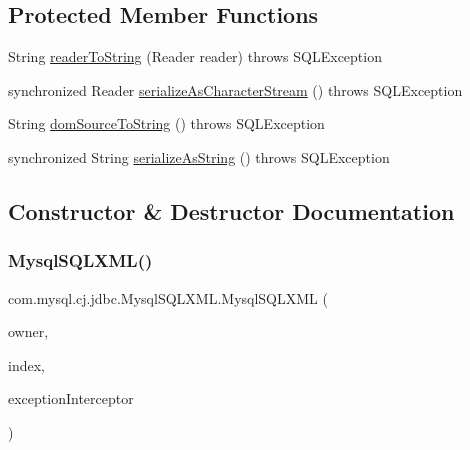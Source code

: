 \subsection*{Protected Member Functions}
\begin{DoxyCompactItemize}
\item 
String \mbox{\hyperlink{classcom_1_1mysql_1_1cj_1_1jdbc_1_1_mysql_s_q_l_x_m_l_ad11ae3ca836ed96ffae35eff31a9a2a9}{reader\+To\+String}} (Reader reader)  throws S\+Q\+L\+Exception 
\item 
synchronized Reader \mbox{\hyperlink{classcom_1_1mysql_1_1cj_1_1jdbc_1_1_mysql_s_q_l_x_m_l_a8fd29ddd9cbe412e6f466d876eab9495}{serialize\+As\+Character\+Stream}} ()  throws S\+Q\+L\+Exception 
\item 
String \mbox{\hyperlink{classcom_1_1mysql_1_1cj_1_1jdbc_1_1_mysql_s_q_l_x_m_l_a97d6a44faa7825851b8f3555e2b794d6}{dom\+Source\+To\+String}} ()  throws S\+Q\+L\+Exception 
\item 
synchronized String \mbox{\hyperlink{classcom_1_1mysql_1_1cj_1_1jdbc_1_1_mysql_s_q_l_x_m_l_a7ffb73b86dd1fb3cc863bdf90abcb170}{serialize\+As\+String}} ()  throws S\+Q\+L\+Exception 
\end{DoxyCompactItemize}


\subsection{Constructor \& Destructor Documentation}
\mbox{\label{classcom_1_1mysql_1_1cj_1_1jdbc_1_1_mysql_s_q_l_x_m_l_a47f9e3571a47550066900bbd85857a6a}} 
\subsubsection{\texorpdfstring{Mysql\+S\+Q\+L\+X\+M\+L()}{MysqlSQLXML()}\hspace{0.1cm}{\footnotesize\ttfamily [1/2]}}
{\footnotesize\ttfamily com.\+mysql.\+cj.\+jdbc.\+Mysql\+S\+Q\+L\+X\+M\+L.\+Mysql\+S\+Q\+L\+X\+ML (\begin{DoxyParamCaption}\item[{\mbox{\hyperlink{interfacecom_1_1mysql_1_1cj_1_1jdbc_1_1result_1_1_result_set_internal_methods}{Result\+Set\+Internal\+Methods}}}]{owner,  }\item[{int}]{index,  }\item[{\mbox{\hyperlink{interfacecom_1_1mysql_1_1cj_1_1exceptions_1_1_exception_interceptor}{Exception\+Interceptor}}}]{exception\+Interceptor }\end{DoxyParamCaption})}

